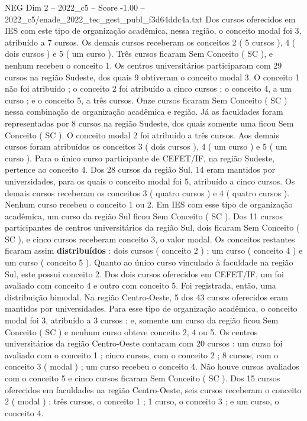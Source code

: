 \begin{textsample}{NEG Dim 2 – 2022\_c5 – Score -1.00 – 2022\_c5/enade\_2022\_tec\_gest\_publ\_f3d64ddc4a.txt}
Dos cursos oferecidos em IES com este tipo de organização acadêmica, nessa região, o conceito modal foi 3, atribuído a 7 cursos.
Os demais cursos receberam os conceitos 2 ( 5 cursos ), 4 ( dois cursos ) e 5 ( um curso ).
Três cursos ficaram Sem Conceito ( SC ), e nenhum recebeu o conceito 1.
Os centros universitários participaram com 29 cursos na região Sudeste, dos quais 9 obtiveram o conceito modal 3.
O conceito 1 não foi atribuído ; o conceito 2 foi atribuído a cinco cursos ; o conceito 4, a um curso ; e o conceito 5, a três cursos.
Onze cursos ficaram Sem Conceito ( SC ) nessa combinação de organização acadêmica e região.
Já as faculdades foram representadas por 8 cursos na região Sudeste, dos quais somente uma ficou Sem Conceito ( SC ).
O conceito modal 2 foi atribuído a três cursos.
Aos demais cursos foram atribuídos os conceitos 3 ( dois cursos ), 4 ( um curso ) e 5 ( um curso ).
Para o único curso participante de CEFET/IF, na região Sudeste, pertence ao conceito 4.
Dos 28 cursos da região Sul, 14 eram mantidos por universidades, para os quais o conceito modal foi 5, atribuído a cinco cursos.
Os demais cursos receberam os conceitos 3 ( quatro cursos ) e 4 ( quatro cursos ).
Nenhum curso recebeu o conceito 1 ou 2.
Em IES com esse tipo de organização acadêmica, um curso da região Sul ficou Sem Conceito ( SC ).
Dos 11 cursos participantes de centros universitários da região Sul, dois ficaram Sem Conceito ( SC ), e cinco cursos receberam conceito 3, o valor modal.
Os conceitos restantes ficaram assim \textbf{distribuídos} : dois cursos ( conceito 2 ) ; um curso ( conceito 4 ) e um curso ( conceito 5 ).
Quanto ao único curso vinculado à faculdade na região Sul, este possui conceito 2.
Dos dois cursos oferecidos em CEFET/IF, um foi avaliado com conceito 4 e outro com conceito 5.
Foi registrada, então, uma distribuição bimodal.
Na região Centro-Oeste, 5 dos 43 cursos oferecidos eram mantidos por universidades.
Para esse tipo de organização acadêmica, o conceito modal foi 3, atribuído a 3 cursos ; e, somente um curso da região ficou Sem Conceito ( SC ) e nenhum curso obteve conceito 2, 4 ou 5.
Os centros universitários da região Centro-Oeste contaram com 20 cursos : um curso foi avaliado com o conceito 1 ; cinco cursos, com o conceito 2 ; 8 cursos, com o conceito 3 ( modal ) ; um curso recebeu o conceito 4.
Não houve cursos avaliados com o conceito 5 e cinco cursos ficaram Sem Conceito ( SC ).
Dos 15 cursos oferecidos em faculdades na região Centro-Oeste, seis cursos receberam o conceito 2 ( modal ) ; três cursos, o conceito 1 ; 1 curso, o conceito 3 ; e um curso, o conceito 4.

\end{textsample}
